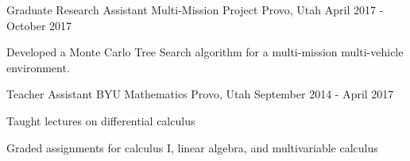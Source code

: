 \begin{cventries}
  \cventry
    {Graduate Research Assistant}
    {Multi-Mission Project}
    {Provo, Utah}
    {April 2017 - October 2017}
    {
      \begin{cvitems}
        \item Developed a Monte Carlo Tree Search algorithm for a multi-mission multi-vehicle environment.
      \end{cvitems}
    }

  \cventry
    {Teacher Assistant}
    {BYU Mathematics}
    {Provo, Utah}
    {September 2014 - April 2017}
    {
      \begin{cvitems}
        \item Taught lectures on differential calculus
        \item Graded assignments for calculus I, linear algebra, and multivariable calculus
      \end{cvitems}
    }

\end{cventries}
